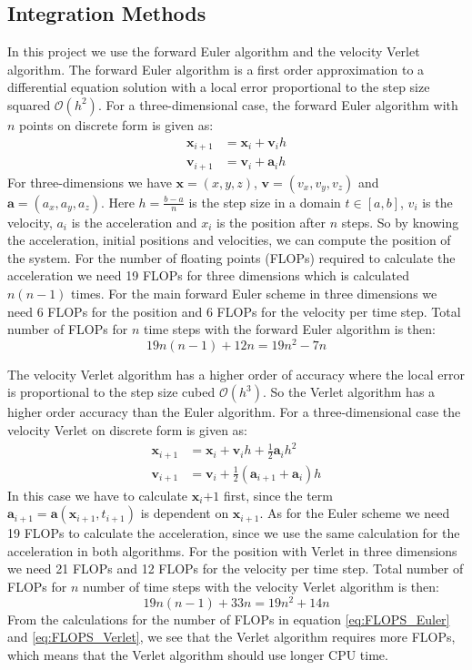 \documentclass[12pt,a4paper,english]{article}
\begin{document}
\subsection{Integration Methods}
\label{subsect:Integration}
In this project we use the forward Euler algorithm and the velocity Verlet algorithm. The forward Euler algorithm is a first order approximation to a differential equation solution with a local error proportional to the step size squared $\mathcal{O}(h^2)$. For a three-dimensional case, the forward Euler algorithm with $n$ points on discrete form is given as:
\begin{align}
\label{eq:1D_Euler}
\textbf{x}_{i+1}&=\textbf{x}_i+\textbf{v}_ih\\
\textbf{v}_{i+1}&=\textbf{v}_i+\textbf{a}_ih
\end{align}
For three-dimensions we have $\textbf{x}=(x,y,z)$, $\textbf{v}=(v_x,v_y,v_z)$ and $\textbf{a}=(a_x,a_y,a_z)$. Here $h=\frac{b-a}{n}$ is the step size in a domain $t\in[a,b]$, $v_i$ is the velocity, $a_i$ is the acceleration and $x_i$ is the position after $n$ steps. So by knowing the acceleration, initial positions and velocities, we can compute the position of the system. For the number of floating points (FLOPs) required to calculate the acceleration we need 19 FLOPs for three dimensions which is calculated $n(n-1)$ times. For the main forward Euler scheme in three dimensions we need 6 FLOPs for the position and 6 FLOPs for the velocity per time step. Total number of FLOPs for $n$ time steps with the forward Euler algorithm is then:
\begin{equation}
\label{eq:FLOPS_Euler}
19n(n-1)+12n=19n^2-7n
\end{equation}

The velocity Verlet algorithm has a higher order of accuracy where the local error is proportional to the step size cubed $\mathcal{O}(h^3)$. So the Verlet algorithm has a higher order accuracy than the Euler algorithm. For a three-dimensional case the velocity Verlet on discrete form is given as:
\begin{align}
\label{eq:2D_Verlet}
\textbf{x}_{i+1}&=\textbf{x}_i+\textbf{v}_ih+\frac{1}{2}\textbf{a}_ih^2\\
\textbf{v}_{i+1}&=\textbf{v}_i+\frac{1}{2}(\textbf{a}_{i+1}+\textbf{a}_i)h
\end{align}
In this case we have to calculate $\textbf{x}_i{+1}$ first, since the term $\textbf{a}_{i+1}=\textbf{a}(\textbf{x}_{i+1},t_{i+1})$ is dependent on $\textbf{x}_{i+1}$. As for the Euler scheme we need 19 FLOPs to calculate the acceleration, since we use the same calculation for the acceleration in both algorithms. For the position with Verlet in three dimensions we need 21 FLOPs and 12 FLOPs for the velocity per time step. Total number of FLOPs for $n$ number of time steps with the velocity Verlet algorithm is then:
\begin{equation}
\label{eq:FLOPS_Verlet}
19n(n-1)+33n=19n^2+14n
\end{equation}
From the calculations for the number of FLOPs in equation \ref{eq:FLOPS_Euler} and \ref{eq:FLOPS_Verlet}, we see that the Verlet algorithm requires more FLOPs, which means that the Verlet algorithm should use longer CPU time.
\end{document}
